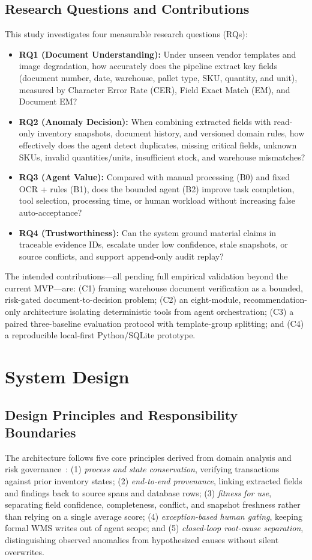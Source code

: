 \documentclass[conference]{IEEEtran}
\begin{document}
\subsection{Research Questions and Contributions}
This study investigates four measurable research questions (RQs):
\begin{itemize}
    \item \textbf{RQ1 (Document Understanding):} Under unseen vendor templates and image degradation, how accurately does the pipeline extract key fields (document number, date, warehouse, pallet type, SKU, quantity, and unit), measured by Character Error Rate (CER), Field Exact Match (EM), and Document EM?
    \item \textbf{RQ2 (Anomaly Decision):} When combining extracted fields with read-only inventory snapshots, document history, and versioned domain rules, how effectively does the agent detect duplicates, missing critical fields, unknown SKUs, invalid quantities/units, insufficient stock, and warehouse mismatches?
    \item \textbf{RQ3 (Agent Value):} Compared with manual processing (B0) and fixed OCR + rules (B1), does the bounded agent (B2) improve task completion, tool selection, processing time, or human workload without increasing false auto-acceptance?
    \item \textbf{RQ4 (Trustworthiness):} Can the system ground material claims in traceable evidence IDs, escalate under low confidence, stale snapshots, or source conflicts, and support append-only audit replay?
\end{itemize}

The intended contributions---all pending full empirical validation beyond the current MVP---are: (C1) framing warehouse document verification as a bounded, risk-gated document-to-decision problem; (C2) an eight-module, recommendation-only architecture isolating deterministic tools from agent orchestration; (C3) a paired three-baseline evaluation protocol with template-group splitting; and (C4) a reproducible local-first Python/SQLite prototype.

\section{System Design}

\subsection{Design Principles and Responsibility Boundaries}
The architecture follows five core principles derived from domain analysis and risk governance~\cite{b11,b13,b14}: (1) \textit{process and state conservation}, verifying transactions against prior inventory states; (2) \textit{end-to-end provenance}, linking extracted fields and findings back to source spans and database rows; (3) \textit{fitness for use}, separating field confidence, completeness, conflict, and snapshot freshness rather than relying on a single average score; (4) \textit{exception-based human gating}, keeping formal WMS writes out of agent scope; and (5) \textit{closed-loop root-cause separation}, distinguishing observed anomalies from hypothesized causes without silent overwrites.
\end{document}
